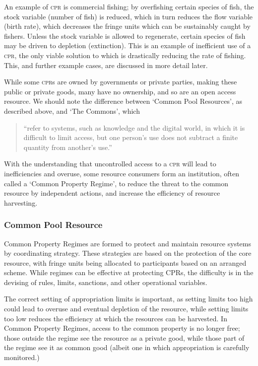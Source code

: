 An example of \textsc{cpr} is commercial fishing; by overfishing certain species of fish, the stock variable (number of fish) is reduced, which in turn reduces the flow variable (birth rate), which decreases the fringe units which can be sustainably caught by fishers. Unless the stock variable is allowed to regenerate, certain species of fish may be driven to depletion (extinction). This is an example of inefficient use of a \textsc{cpr}, the only viable solution to which is drastically reducing the rate of fishing. This, and further example cases, are discussed in more detail later.

While some \textsc{cpr}s are owned by governments or private parties, making these public or private goods, many have no ownership, and so are an open access resource. We should note the difference between `Common Pool Resources', as described above, and `The Commons', which

\begin{quote}
	``refer to systems, such as knowledge and the digital world, in which it is difficult to limit access, but one person's use does not subtract a finite quantity from another's use.''~\cite{Ostrom-challenge-90}
\end{quote}

With the understanding that uncontrolled access to a \textsc{cpr} will lead to inefficiencies and overuse, some resource consumers form an institution, often called a `Common Property Regime', to reduce the threat to the common resource by independent actions, and increase the efficiency of resource harvesting.

\subsubsection{Common Pool Resource}

Common Property Regimes are formed to protect and maintain resource systems by coordinating strategy. These strategies are based on the protection of the core resource, with fringe units being allocated to participants based on an arranged scheme. While regimes can be effective at protecting \textsc{CPR}s, the difficulty is in the devising of rules, limits, sanctions, and other operational variables.

The correct setting of appropriation limits is important, as setting limits too high could lead to overuse and eventual depletion of the resource, while setting limits too low reduces the efficiency at which the resources can be harvested. In Common Property Regimes, access to the common property is no longer free; those outside the regime see the resource as a private good, while those part of the regime see it as common good (albeit one in which appropriation is carefully monitored.)


